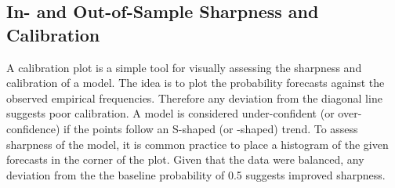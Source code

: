 \documentclass[aoas, preprint]{imsart}
\numberwithin{equation}{section}
\theoremstyle{plain}
\begin{document}
\subsection{In- and Out-of-Sample Sharpness and Calibration}
\label{calibration}
A calibration plot is a simple tool for visually assessing the sharpness and calibration of a model. The idea is to plot the probability forecasts against the observed empirical frequencies. Therefore any deviation from the diagonal line suggests poor calibration. A model is considered under-confident (or over-confidence) if the points follow an S-shaped (or -shaped) trend. To assess sharpness of the model, it is common practice to place a histogram of the given forecasts in the corner of the plot. Given that the data were balanced, any deviation from the the baseline probability of 0.5 suggests improved sharpness.
\end{document}
